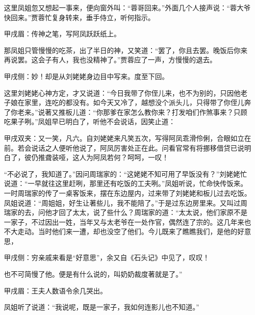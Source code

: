 \begin{parag}
    这里凤姐忽又想起一事来，便向窗外叫：“蓉哥回来。”外面几个人接声说：“蓉大爷快回来。”贾蓉忙复身转来，垂手侍立，听何指示。\begin{note}甲戌眉：传神之笔，写阿凤跃跃纸上。\end{note}那凤姐只管慢慢的吃茶，出了半日的神，又笑道：“罢了，你且去罢。晚饭后你来再说罢。这会子有人，我也没精神了。”贾蓉应了一声，方慢慢的退去。\begin{note}甲戌侧：妙！却是从刘姥姥身边目中写来。度至下回。\end{note}
\end{parag}


\begin{parag}
    这里刘姥姥心神方定，才又说道：“今日我带了你侄儿来，也不为别的，只因他老子娘在家里，连吃的都没有。如今天又冷了，越想没个派头儿，只得带了你侄儿奔了你老来。”说著又推板儿道：“你那爹在家怎么教你来？打发咱们作煞事来？只顾吃果子咧。”凤姐早已明白了，听他不会说话，因笑止道：\begin{note}甲戌双夹：又一笑，凡六。自刘姥姥来凡笑五次，写得阿凤乖滑伶俐，合眼如立在前。若会说话之人便听他说了，阿凤厉害处正在此。问看官常有将挪移借贷已说明白了，彼仍推聋装哑，这人为阿凤若何？呵呵，一叹！\end{note}“不必说了，我知道了。”因问周瑞家的：“这姥姥不知可用了早饭没有？”刘姥姥忙说道：“一早就往这里赶咧，那里还有吃饭的工夫咧。”凤姐听说，忙命快传饭来。一时周瑞家的传了一桌客饭来，摆在东边屋内，过来带了刘姥姥和板儿过去吃饭。凤姐说道：“周姐姐，好生让著些儿，我不能陪了。”于是过东边房里来。又叫过周瑞家的去，问他才回了太太，说了些什么？周瑞家的道：“太太说，他们家原不是一家子，不过因出一姓，当年又与太老爷在一处作官，偶然连了宗的。这几年来也不大走动。当时他们来一遭，却也没空了他们。今儿既来了瞧瞧我们，是他的好意思，\begin{note}甲戌侧：穷亲戚来看是“好意思”，余又自《石头记》中见了，叹叹！\end{note}也不可简慢了他。便是有什么说的，叫奶奶裁度著就是了。”\begin{note}甲戌眉：王夫人数语令余几哭出。\end{note}凤姐听了说道：“我说呢，既是一家子，我如何连影儿也不知道。”
\end{parag}


